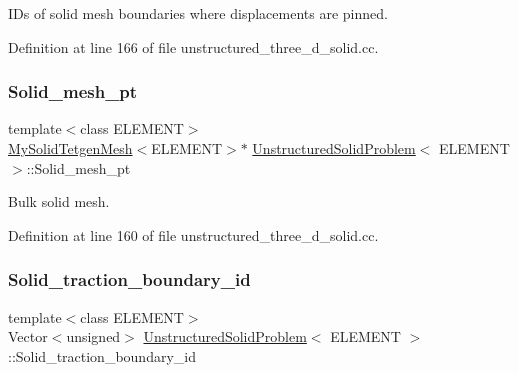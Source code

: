 I\+Ds of solid mesh boundaries where displacements are pinned. 



Definition at line 166 of file unstructured\+\_\+three\+\_\+d\+\_\+solid.\+cc.

\mbox{\label{classUnstructuredSolidProblem_ad6a8cbe2c2f3596385e1a2484bfb68f7}} 
\subsubsection{\texorpdfstring{Solid\+\_\+mesh\+\_\+pt}{Solid\_mesh\_pt}}
{\footnotesize\ttfamily template$<$class E\+L\+E\+M\+E\+NT$>$ \\
\hyperlink{classMySolidTetgenMesh}{My\+Solid\+Tetgen\+Mesh}$<$E\+L\+E\+M\+E\+NT$>$$\ast$ \hyperlink{classUnstructuredSolidProblem}{Unstructured\+Solid\+Problem}$<$ E\+L\+E\+M\+E\+NT $>$\+::Solid\+\_\+mesh\+\_\+pt\hspace{0.3cm}{\ttfamily [private]}}



Bulk solid mesh. 



Definition at line 160 of file unstructured\+\_\+three\+\_\+d\+\_\+solid.\+cc.

\mbox{\label{classUnstructuredSolidProblem_a4cf906bac719c9a942c04bda2798080f}} 
\subsubsection{\texorpdfstring{Solid\+\_\+traction\+\_\+boundary\+\_\+id}{Solid\_traction\_boundary\_id}}
{\footnotesize\ttfamily template$<$class E\+L\+E\+M\+E\+NT$>$ \\
Vector$<$unsigned$>$ \hyperlink{classUnstructuredSolidProblem}{Unstructured\+Solid\+Problem}$<$ E\+L\+E\+M\+E\+NT $>$\+::Solid\+\_\+traction\+\_\+boundary\+\_\+id\hspace{0.3cm}{\ttfamily [private]}}



